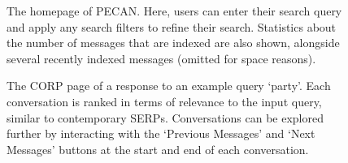 \begin{figure}[t!]
	\caption{The homepage of PECAN. Here, users can enter their search query and apply any search filters to refine their search. Statistics about the number of messages that are indexed are also shown, alongside several recently indexed messages (omitted for space reasons).\vspace{-8pt}}
	\label{fig:homepage}
\end{figure}

\begin{figure}[t!]
	\caption{The CORP page of a response to an example query `party'. Each conversation is ranked in terms of relevance to the input query, similar to contemporary SERPs. Conversations can be explored further by interacting with the `Previous Messages' and `Next Messages' buttons at the start and end of each conversation.\vspace{-8pt}}
	\label{fig:searching}
\end{figure}

